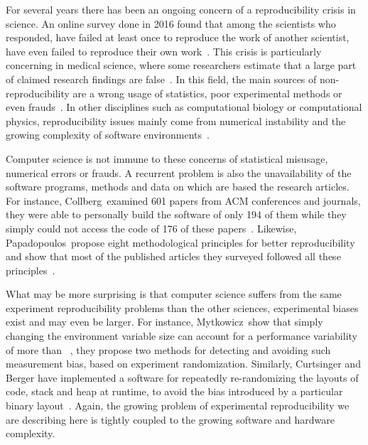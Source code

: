             For several years there has been an ongoing concern of a reproducibility crisis in science. An online survey
            done in 2016 found that among the  scientists who responded,  have failed at
            least once to reproduce the work of another scientist,  have even failed to reproduce
            their own work~\cite{nature_survey}. This crisis is particularly concerning in medical science, where some
            researchers estimate that a large part of claimed research findings are
            false~\cite{Ioannidis_2005,freedman}. In this field, the main sources of non-reproducibility are a wrong
            usage of statistics, poor experimental methods or even frauds~\cite{science_misconduct}. In other
            disciplines such as computational biology or computational physics, reproducibility issues mainly come
            from numerical instability and the growing complexity of software environments~\cite{dong2021}.

            Computer science is not immune to these concerns of statistical misusage, numerical errors or frauds.  A
            recurrent problem is also the unavailability of the software programs, methods and data on which are based the
            research articles. For instance, Collberg~\etal examined 601 papers from ACM conferences and journals, they
            were able to personally build the software of only 194 of them while they simply could not access the code
            of 176 of these papers~\cite{collberg2015repeatability}. Likewise, Papadopoulos~\etal propose eight
            methodological principles for better reproducibility and show that most of the published articles
            they surveyed followed all these principles~\cite{Papadopoulos_2019}.

            What may be more surprising is that computer science suffers from the same experiment reproducibility
            problems than the other sciences, experimental biases exist and may even be larger. For instance,
            Mytkowicz~\etal show that simply changing the environment variable size can account for a performance
            variability of more than ~\cite{Mytkowicz_2009}, they propose two methods for detecting
            and avoiding such measurement bias, based on experiment randomization. Similarly, Curtsinger and Berger have
            implemented a software for repeatedly re-randomizing the layouts of code, stack and heap at runtime, to
            avoid the bias introduced by a particular binary layout~\cite{stabilizer}. Again, the growing problem of
            experimental reproducibility we are describing here is tightly coupled to the growing software and hardware
            complexity.

